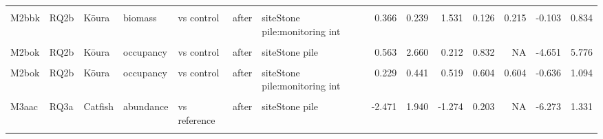 \documentclass[
  12pt,
  a4paper,
  oneside]{scrbook}
\begin{document}
\begin{landscape}
\begin{longtable}[t]{lllllllrrrrrrr}
\cellcolor{gray!8}{M2bbk} & \cellcolor{gray!8}{RQ2b} & \cellcolor{gray!8}{Kōura} & \cellcolor{gray!8}{biomass} & \cellcolor{gray!8}{vs control} & \cellcolor{gray!8}{after} & \cellcolor{gray!8}{monitoring int} & \cellcolor{gray!8}{-0.427} & \cellcolor{gray!8}{0.191} & \cellcolor{gray!8}{-2.240} & \cellcolor{gray!8}{0.025} & \cellcolor{gray!8}{NA} & \cellcolor{gray!8}{-0.800} & \cellcolor{gray!8}{-0.053}\\
M2bbk & RQ2b & Kōura & biomass & vs control & after & siteStone pile:monitoring int & 0.366 & 0.239 & 1.531 & 0.126 & 0.215 & -0.103 & 0.834\\
\cellcolor{gray!8}{M2bok} & \cellcolor{gray!8}{RQ2b} & \cellcolor{gray!8}{Kōura} & \cellcolor{gray!8}{occupancy} & \cellcolor{gray!8}{vs control} & \cellcolor{gray!8}{after} & \cellcolor{gray!8}{(Intercept)} & \cellcolor{gray!8}{1.585} & \cellcolor{gray!8}{1.885} & \cellcolor{gray!8}{0.841} & \cellcolor{gray!8}{0.400} & \cellcolor{gray!8}{NA} & \cellcolor{gray!8}{-2.109} & \cellcolor{gray!8}{5.280}\\
\addlinespace
M2bok & RQ2b & Kōura & occupancy & vs control & after & siteStone pile & 0.563 & 2.660 & 0.212 & 0.832 & NA & -4.651 & 5.776\\
\cellcolor{gray!8}{M2bok} & \cellcolor{gray!8}{RQ2b} & \cellcolor{gray!8}{Kōura} & \cellcolor{gray!8}{occupancy} & \cellcolor{gray!8}{vs control} & \cellcolor{gray!8}{after} & \cellcolor{gray!8}{monitoring int} & \cellcolor{gray!8}{-0.403} & \cellcolor{gray!8}{0.311} & \cellcolor{gray!8}{-1.296} & \cellcolor{gray!8}{0.195} & \cellcolor{gray!8}{NA} & \cellcolor{gray!8}{-1.014} & \cellcolor{gray!8}{0.207}\\
M2bok & RQ2b & Kōura & occupancy & vs control & after & siteStone pile:monitoring int & 0.229 & 0.441 & 0.519 & 0.604 & 0.604 & -0.636 & 1.094\\
\cellcolor{gray!8}{M3aac} & \cellcolor{gray!8}{RQ3a} & \cellcolor{gray!8}{Catfish} & \cellcolor{gray!8}{abundance} & \cellcolor{gray!8}{vs reference} & \cellcolor{gray!8}{after} & \cellcolor{gray!8}{(Intercept)} & \cellcolor{gray!8}{-7.151} & \cellcolor{gray!8}{1.282} & \cellcolor{gray!8}{-5.577} & \cellcolor{gray!8}{0.000} & \cellcolor{gray!8}{NA} & \cellcolor{gray!8}{-9.664} & \cellcolor{gray!8}{-4.638}\\
M3aac & RQ3a & Catfish & abundance & vs reference & after & siteStone pile & -2.471 & 1.940 & -1.274 & 0.203 & NA & -6.273 & 1.331\\
\addlinespace
\cellcolor{gray!8}{M3aac} & \cellcolor{gray!8}{RQ3a} & \cellcolor{gray!8}{Catfish} & \cellcolor{gray!8}{abundance} & \cellcolor{gray!8}{vs reference} & \cellcolor{gray!8}{after} & \cellcolor{gray!8}{monitoring int} & \cellcolor{gray!8}{-0.215} & \cellcolor{gray!8}{0.147} & \cellcolor{gray!8}{-1.462} & \cellcolor{gray!8}{0.144} & \cellcolor{gray!8}{NA} & \cellcolor{gray!8}{-0.504} & \cellcolor{gray!8}{0.073}\\

\end{longtable}
\end{landscape}
\end{document}
